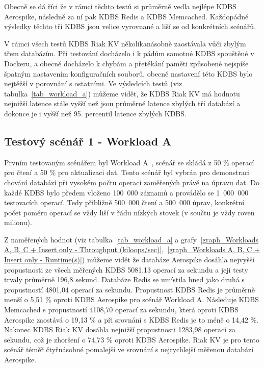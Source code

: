 \documentclass[czech,master,dept460,male,csharp,cpdeclaration]{diploma}
\begin{document}
	Obecně se dá říci že v rámci těchto testů si průměrně vedla nejlépe KDBS Aerospike, následně za ní pak KDBS Redis a KDBS Memcached. Každopádně výsledky těchto tří KDBS jsou velice vyrovnané a liší se od konkrétních scénářů.
	
	V rámci všech testů KDBS Riak KV několikanásobně zaostávala vůči zbylým třem databázím. Při testování docházelo i k pádům samotné KDBS spouštěné v Dockeru, a obecně docházelo k chybám a přetékání paměti způsobené nejspíše špatným nastavením konfiguračních souborů, obecně nastavení této KDBS bylo nejtěžší v porovnání s ostatními. Ve výsledcích testů (viz tabulka~\ref{tab_workload_a}) můžeme vidět, že KDBS Riak KV má hodnotu nejnižší latence stále vyšší než jsou průměrné latence zbylých tří databází a dokonce je i vyšší než 95. percentil latence zbylých KDBS.
	
	\subsection{Testový scénář 1 - Workload A}
	
	Prvním testovaným scénářem byl Workload A~\cite{workloads}, scénář se skládá z 50 \% operací pro čtení a 50 \% pro aktualizaci dat. Tento scénář byl vybrán pro demonstraci chování databází při vysokém počtu operací zaměřených právě na úpravu dat. Do každé KDBS bylo předem vloženo 100~000 záznamů a provádělo se 1~000~000 testovacích operací. Tedy přibližně 500~000 čtení a 500~000 úprav, konkrétní počet poměru operací se vždy liší v řádu nízkých stovek (v součtu je vždy roven milionu).
	
	Z naměřených hodnot (viz tabulka~\ref{tab_workload_a} a grafy~\ref{graph_Workloads A, B, C + Insert only - Throughput (kiloops/sec)},~\ref{graph_Workloads A, B, C + Insert only - Runtime(s)}) můžeme vidět že databáze Aerospike dosáhla nejvyšší propustnosti ze všech měřených KDBS 5081,13 operací za sekundu a její testy trvaly průměrně 196,8 sekund. Databáze Redis se umístila hned jako druhá s propustností 4801,04 operací za sekundu. Propustnost KDBS Redis je průměrně menší o 5,51 \% oproti KDBS Aerospike pro scénář Workload A. Následuje KDBS Memcached s propustností 4108,70 operací za sekundu, která oproti KDBS Aerospike zaostává o 19,13 \% a při srovnání s KDBS Redis je to méně o 14,42 \%. Nakonec KDBS Riak KV dosáhla nejnižší propustnosti 1283,98 operací za sekundu, což je zhoršení o 74,73 \% oproti KDBS Aerospike. Riak KV je pro tento scénář téměř čtyřnásobné pomalejší ve srovnání s nejrychlejší měřenou databází Aerospike.
	
\end{document}
